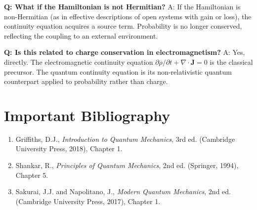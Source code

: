 \textbf{Q: What if the Hamiltonian is not Hermitian?}
A: If the Hamiltonian is non-Hermitian (as in effective descriptions of open systems with gain or loss), the continuity equation acquires a source term. Probability is no longer conserved, reflecting the coupling to an external environment.

\textbf{Q: Is this related to charge conservation in electromagnetism?}
A: Yes, directly. The electromagnetic continuity equation $\partial\rho/\partial t + \nabla \cdot \mathbf{J} = 0$ is the classical precursor. The quantum continuity equation is its non-relativistic quantum counterpart applied to probability rather than charge.
\section*{Important Bibliography}

\begin{enumerate}
\item Griffiths, D.J., \textit{Introduction to Quantum Mechanics}, 3rd ed. (Cambridge University Press, 2018), Chapter 1.
\item Shankar, R., \textit{Principles of Quantum Mechanics}, 2nd ed. (Springer, 1994), Chapter 5.
\item Sakurai, J.J. and Napolitano, J., \textit{Modern Quantum Mechanics}, 2nd ed. (Cambridge University Press, 2017), Chapter 1.
\end{enumerate}

